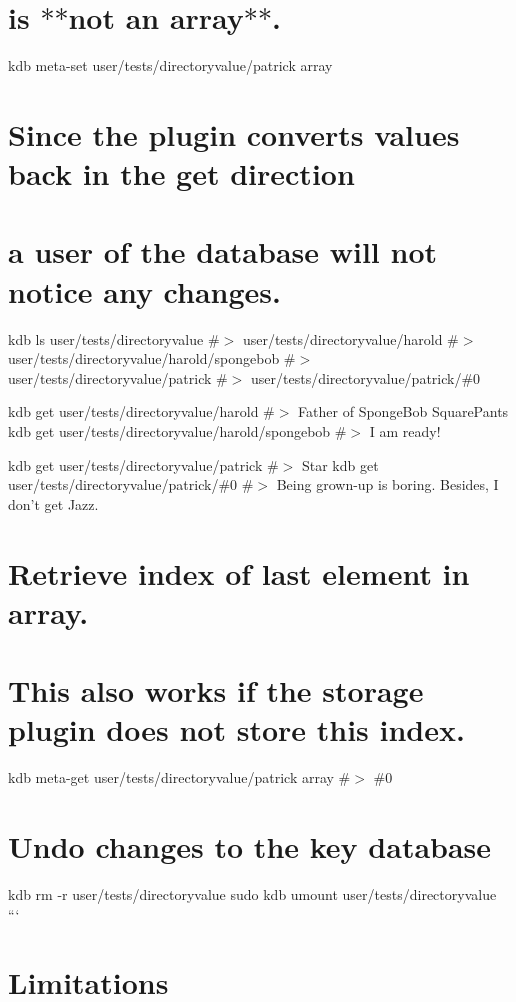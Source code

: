 \hypertarget{autotoc_md172_autotoc_md184}{}\section{is $\ast$$\ast$not an array$\ast$$\ast$.}\label{autotoc_md172_autotoc_md184}
kdb meta-\/set user/tests/directoryvalue/patrick array \textquotesingle{}\textquotesingle{}\hypertarget{autotoc_md172_autotoc_md185}{}\section{Since the plugin converts values back in the get direction}\label{autotoc_md172_autotoc_md185}
\hypertarget{autotoc_md172_autotoc_md186}{}\section{a user of the database will not notice any changes.}\label{autotoc_md172_autotoc_md186}
kdb ls user/tests/directoryvalue \#$>$ user/tests/directoryvalue/harold \#$>$ user/tests/directoryvalue/harold/spongebob \#$>$ user/tests/directoryvalue/patrick \#$>$ user/tests/directoryvalue/patrick/\#0

kdb get user/tests/directoryvalue/harold \#$>$ Father of Sponge\+Bob Square\+Pants kdb get user/tests/directoryvalue/harold/spongebob \#$>$ I am ready!

kdb get user/tests/directoryvalue/patrick \#$>$ Star kdb get user/tests/directoryvalue/patrick/\#0 \#$>$ Being grown-\/up is boring. Besides, I don’t get Jazz.\hypertarget{autotoc_md172_autotoc_md187}{}\section{Retrieve index of last element in array.}\label{autotoc_md172_autotoc_md187}
\hypertarget{autotoc_md172_autotoc_md188}{}\section{This also works if the storage plugin does not store this index.}\label{autotoc_md172_autotoc_md188}
kdb meta-\/get user/tests/directoryvalue/patrick array \#$>$ \#0\hypertarget{autotoc_md172_autotoc_md189}{}\section{Undo changes to the key database}\label{autotoc_md172_autotoc_md189}
kdb rm -\/r user/tests/directoryvalue sudo kdb umount user/tests/directoryvalue ```\hypertarget{autotoc_md172_autotoc_md190}{}\section{Limitations}\label{autotoc_md172_autotoc_md190}

